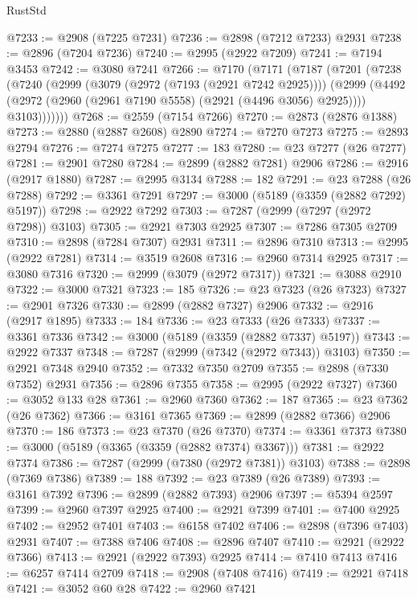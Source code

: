 \begin{lexlean}{RustStd}
\begin{coremodule}
@7233 := @2908 (@7225 @7231)
@7236 := @2898 (@7212 @7233) @2931
@7238 := @2896 (@7204 @7236)
@7240 := @2995 (@2922 @7209)
@7241 := @7194 @3453
@7242 := @3080 @7241
@7266 := @7170
    (@7171
      (@7187
        (@7201
          (@7238
            (@7240
              (@2999
                (@3079 (@2972 (@7193 (@2921 @7242 @2925))))
                (@2999
                  (@4492 (@2972 (@2960 (@2961 @7190 @5558) (@2921 (@4496 @3056) @2925))))
                  @3103)))))))
@7268 := @2559 (@7154 @7266)
@7270 := @2873 (@2876 @1388)
@7273 := @2880 (@2887 @2608) @2890
@7274 := @7270 @7273
@7275 := @2893 @2794
@7276 := @7274 @7275
@7277 := 183
@7280 := @23 @7277 (@26 @7277)
@7281 := @2901 @7280
@7284 := @2899 (@2882 @7281) @2906
@7286 := @2916 (@2917 @1880)
@7287 := @2995 @3134
@7288 := 182
@7291 := @23 @7288 (@26 @7288)
@7292 := @3361 @7291
@7297 := @3000 (@5189 (@3359 (@2882 @7292) @5197))
@7298 := @2922 @7292
@7303 := @7287 (@2999 (@7297 (@2972 @7298)) @3103)
@7305 := @2921 @7303 @2925
@7307 := @7286 @7305 @2709
@7310 := @2898 (@7284 @7307) @2931
@7311 := @2896 @7310
@7313 := @2995 (@2922 @7281)
@7314 := @3519 @2608
@7316 := @2960 @7314 @2925
@7317 := @3080 @7316
@7320 := @2999 (@3079 (@2972 @7317))
@7321 := @3088 @2910
@7322 := @3000 @7321
@7323 := 185
@7326 := @23 @7323 (@26 @7323)
@7327 := @2901 @7326
@7330 := @2899 (@2882 @7327) @2906
@7332 := @2916 (@2917 @1895)
@7333 := 184
@7336 := @23 @7333 (@26 @7333)
@7337 := @3361 @7336
@7342 := @3000 (@5189 (@3359 (@2882 @7337) @5197))
@7343 := @2922 @7337
@7348 := @7287 (@2999 (@7342 (@2972 @7343)) @3103)
@7350 := @2921 @7348 @2940
@7352 := @7332 @7350 @2709
@7355 := @2898 (@7330 @7352) @2931
@7356 := @2896 @7355
@7358 := @2995 (@2922 @7327)
@7360 := @3052 @133 @28
@7361 := @2960 @7360
@7362 := 187
@7365 := @23 @7362 (@26 @7362)
@7366 := @3161 @7365
@7369 := @2899 (@2882 @7366) @2906
@7370 := 186
@7373 := @23 @7370 (@26 @7370)
@7374 := @3361 @7373
@7380 := @3000 (@5189 (@3365 (@3359 (@2882 @7374) @3367)))
@7381 := @2922 @7374
@7386 := @7287 (@2999 (@7380 (@2972 @7381)) @3103)
@7388 := @2898 (@7369 @7386)
@7389 := 188
@7392 := @23 @7389 (@26 @7389)
@7393 := @3161 @7392
@7396 := @2899 (@2882 @7393) @2906
@7397 := @5394 @2597
@7399 := @2960 @7397 @2925
@7400 := @2921 @7399
@7401 := @7400 @2925
@7402 := @2952 @7401
@7403 := @6158 @7402
@7406 := @2898 (@7396 @7403) @2931
@7407 := @7388 @7406
@7408 := @2896 @7407
@7410 := @2921 (@2922 @7366)
@7413 := @2921 (@2922 @7393) @2925
@7414 := @7410 @7413
@7416 := @6257 @7414 @2709
@7418 := @2908 (@7408 @7416)
@7419 := @2921 @7418
@7421 := @3052 @60 @28
@7422 := @2960 @7421

\end{coremodule}
\end{lexlean}
